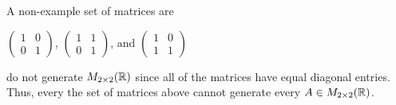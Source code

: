 \begin{eg}[Matrices]
A non-example set of matrices are
\begin{center}
    \( \begin{pmatrix}
        1 & 0 \\ 
        0 & 1 
    \end{pmatrix} \), \( \begin{pmatrix}
        1 & 1 \\
        0 & 1 
        \end{pmatrix} \), and \( \begin{pmatrix}
        1 & 0 \\
        1 & 1 
    \end{pmatrix} \)
\end{center}
do not generate \( M_{2 \times 2 }(\mathbb{R} ) \) since all of the matrices have equal diagonal entries. Thus, every the set of matrices above cannot generate every  \( A \in M_{2 \times 2 }(\mathbb{R} )  \).
\end{eg}


